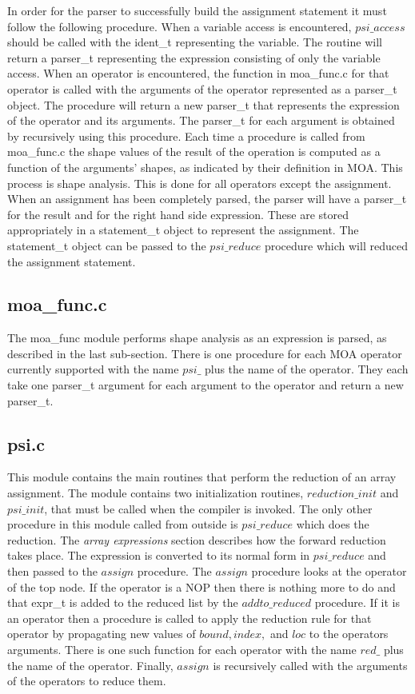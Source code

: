 In order for the parser to successfully build the assignment statement
it must follow the following procedure.  When a variable access is encountered,
$psi\_access$ should be called with the ident\_t representing the variable.
The routine will return a parser\_t representing the expression consisting
of only the variable access.  When an operator is encountered, the function
in moa\_func.c for that operator is called with the arguments of the operator
represented as a parser\_t object.  The procedure will return a new parser\_t
that represents the expression of the operator and its arguments.  The
parser\_t for each argument is obtained by recursively using this procedure.
Each time a procedure is called from moa\_func.c the shape values of the
result of the operation is computed as a function of the arguments' shapes,
as indicated by their definition in MOA.  This process is shape analysis.
This is done for all operators except the assignment.  When an assignment has
been completely parsed, the parser will have a parser\_t for the result and
for the right hand side expression.  These are stored appropriately in a
statement\_t object to represent the assignment.  The statement\_t object
can be passed to the $psi\_reduce$ procedure which will reduced the 
assignment statement.

\subsection{moa\_func.c}
The moa\_func module performs shape analysis as an expression is parsed, as
described in the last sub-section.  There is one procedure for each MOA
operator currently supported with the name $psi\_$ plus the name of the
operator.  They each take one parser\_t argument for each argument to the
operator and return a new parser\_t.

\subsection{psi.c}
This module contains the main routines that perform the reduction of an
array assignment.  The module contains two initialization routines,
$reduction\_init$ and $psi\_init$, that must be called when the compiler is
invoked.  The only other procedure in this module called from outside
is $psi\_reduce$ which does the reduction.  The {\it array expressions} section
describes how the forward reduction takes place.  The expression is
converted to its normal form in $psi\_reduce$ and then passed to the $assign$
procedure.  The $assign$ procedure looks at the operator of the top node.
If the operator is a NOP then there is nothing more to do and that expr\_t
is added to the reduced list by the $addto\_reduced$ procedure.  If it
is an operator then a procedure is called to apply the reduction rule for
that operator by propagating new values of $bound, index,$ and $loc$ to
the operators arguments.  There is one such function for each operator with
the name $red\_$ plus the name of the operator.  Finally, $assign$ is 
recursively called with the arguments of the operators to reduce them.

